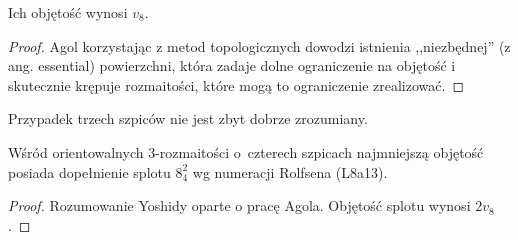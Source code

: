 
Ich objętość wynosi $v_8$.

\begin{proof}
    Agol \cite{agol10} korzystając z metod topologicznych dowodzi istnienia ,,niezbędnej'' (z ang. essential) powierzchni, która zadaje dolne ograniczenie na objętość i skutecznie krępuje rozmaitości, które mogą to ograniczenie zrealizować.
\end{proof}

Przypadek trzech szpiców nie jest zbyt dobrze zrozumiany.

\begin{proposition}
    Wśród orientowalnych 3-rozmaitości o~czterech szpicach najmniejszą objętość posiada dopełnienie splotu $8_4^2$ wg numeracji Rolfsena (L8a13).
\end{proposition}

\begin{proof}
    Rozumowanie Yoshidy \cite{yoshida13} oparte o pracę Agola.
    Objętość splotu wynosi $2v_8$.
\end{proof}


